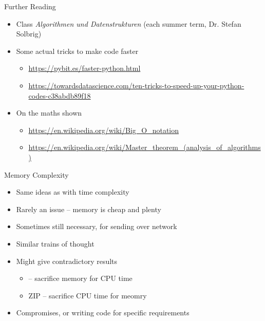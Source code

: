 \begin{frame}{Further Reading}
%
\begin{itemize}
\item Class \emph{Algorithmen und Datenstrukturen} (each summer term, Dr. Stefan Solbrig)
\item Some actual tricks to make code faster
	\begin{itemize}
	\item \url{https://pybit.es/faster-python.html}
	\item \url{https://towardsdatascience.com/ten-tricks-to-speed-up-your-python-codes-c38abdb89f18}
	\end{itemize}
\item On the maths shown
	\begin{itemize}
	\item \url{https://en.wikipedia.org/wiki/Big_O_notation}
	\item \url{https://en.wikipedia.org/wiki/Master_theorem_(analysis_of_algorithms)}
	\end{itemize}
\end{itemize}
%
\end{frame}


\begin{frame}{Memory Complexity}
%
\begin{itemize}
\item Same ideas as with time complexity
\item Rarely an issue -- memory is cheap and plenty
\item Sometimes still necessary, \eg for sending over network
\item Similar trains of thought
\item Might give contradictory results
	\begin{itemize}
	\item {} -- sacrifice memory for CPU time
	\item ZIP -- sacrifice CPU time for meomry
	\end{itemize}
\item[\Thus] Compromises, or writing code for specific requirements
\end{itemize}
%
\end{frame}


